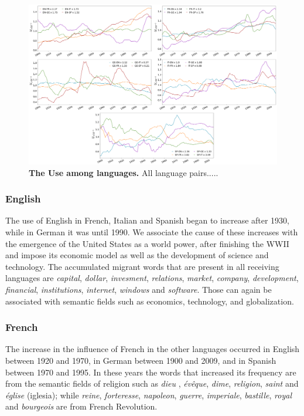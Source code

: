 \documentclass[10pt,letterpaper]{article} %
\begin{document}
\begin{figure}[!h]
	\begin{adjustwidth}{-6cm}{1cm}
		\centering
		\includegraphics[scale=0.28]{UT_2.png}
		\caption{{\bf The Use among languages.} All language pairs.....}
		\label{fig.UT_art}
	\end{adjustwidth}
\end{figure}
\subsubsection*{English} %

The use of English in French, Italian and Spanish began to increase after 1930, while in German it was until 1990. We associate the cause of these increases with the emergence of the United States as a world power, after finishing the WWII and  impose its economic model as well as the development of science and technology. The accumulated migrant words that are present in all receiving  languages are \textit{capital}, \textit{dollar}, \textit{invesment}, \textit{relations}, \textit{market}, \textit{company}, \textit{development}, \textit{financial},  \textit{institutions}, \textit{internet}, \textit{windows} and \textit{software}. Those can again be associated with semantic fields such as economics, technology, and globalization.

\subsubsection*{French} %

The increase in the influence of French in the other languages occurred in English between 1920 and 1970, in German between 1900 and 2009, and in Spanish between 1970 and 1995. In these years the words that increased its frequency are from the semantic fields of religion such as \textit{dieu} , \textit{évêque}, \textit{dime}, \textit{religion}, \textit{saint} and \textit{église} (iglesia); while \textit{reine}, \textit{forteresse}, \textit{napoleon}, \textit{guerre}, \textit{imperiale}, \textit{bastille}, \textit{royal} and \textit{bourgeois} are from French Revolution.
\end{document}
